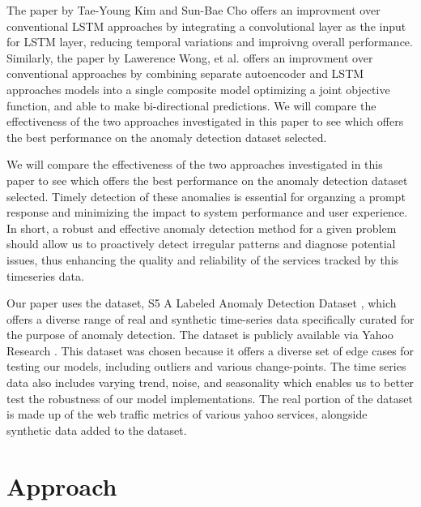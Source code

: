 \documentclass[10pt,twocolumn,letterpaper]{article}
\begin{document}
The paper by Tae-Young Kim and Sun-Bae Cho \cite{kim2018web} offers an improvment over conventional LSTM approaches by integrating a convolutional layer as the input for LSTM layer, reducing temporal variations 
and improivng overall performance. Similarly, the paper by Lawerence Wong, et al. \cite{wong2022aer} offers an improvment over conventional approaches by combining separate autoencoder and LSTM approaches models into 
a single composite model optimizing a joint objective function, and able to make bi-directional predictions. We will compare the effectiveness of the two approaches investigated in this paper to see 
which offers the best performance on the anomaly detection dataset selected.

We will compare the effectiveness of the two approaches investigated in this paper to see which offers the best performance on the anomaly detection dataset selected. Timely detection of these anomalies is essential for organzing a prompt response and minimizing the impact to system performance and user experience. 
In short, a robust and effective anomaly detection method for a given problem should allow us to proactively detect irregular patterns and diagnose potential issues, thus
enhancing the quality and reliability of the services tracked by this timeseries data. 

Our paper uses the dataset, S5 A Labeled Anomaly Detection Dataset \cite{yahooS5}, which offers a diverse range of real and synthetic time-series data specifically curated for the purpose of anomaly detection. 
The dataset is publicly available via Yahoo Research \cite{yahooS5}. This dataset was chosen because it offers a diverse set of edge cases for testing our models, including outliers and various change-points. 
The time series data also includes varying trend, noise, and seasonality which enables us to better test the robustness of our model implementations. 
The real portion of the dataset is made up of the web traffic metrics of various yahoo services, alongside synthetic data added to the dataset.

\section{Approach}
\end{document}
